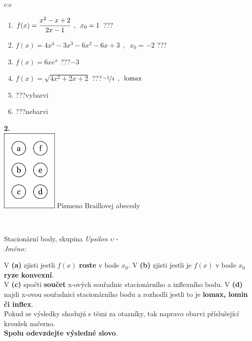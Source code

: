 \documentclass[10pt]{report}
\begin{document}
\begin{tabular}{c:c}
\begin{minipage}[c][104.5mm][t]{0.5\linewidth}
\begin{center}
\begin{minipage}{0.79\linewidth}
\begin{center}
\begin{varwidth}{\linewidth}
\begin{enumerate}
\item $f(x)=\cfrac{x^2-x+2}{2x-1}\enspace , \enspace x_0=1$\quad \dotfill\; ???\;\dotfill \quad {}
\item $f(x)=4x^4-3x^3-6x^2-6x+3\enspace , \enspace x_0=-2$\quad \dotfill\; ???\;\dotfill \quad {}
\item $f(x)=6xe^{x}$\quad \dotfill\; ???\;\dotfill \quad $-3$
\item $f(x)=\sqrt{4x^2+2x+2}$\quad \dotfill\; ???\;\dotfill \quad $\nicefrac{-1}{4}\enspace , \enspace\mathrm{lomax}$
\item \quad \dotfill\; ???\;\dotfill \quad vybarvi
\item \quad \dotfill\; ???\;\dotfill \quad nebarvi
\end{enumerate}
\end{varwidth}
\end{center}
\end{minipage}
\begin{minipage}{0.20\linewidth}
\begin{center}
{\Huge\bfseries 2.} \\[2mm]
\includegraphics[height=40mm]{../images/braille.png}
{\small Písmeno Braillovej abecedy}
\end{center}
\end{minipage}
\end{center}
\end{minipage}
\\ \hdashline
\begin{minipage}[c][104.5mm][t]{0.5\linewidth}
\begin{center}
\vspace{7mm}
{\huge Stacionární body, skupina \textit{Upsilon $\upsilon$} -}\\[5mm]
\textit{Jméno:}\phantom{xxxxxxxxxxxxxxxxxxxxxxxxxxxxxxxxxxxxxxxxxxxxxxxxxxxxxxxxxxxxxxxxx}\\[5mm]
\begin{minipage}{0.95\linewidth}
\begin{center}
{\small V \textbf{(a)} zjisti jestli $f(x)$ \textbf{roste} v bode $x_0$. V \textbf{(b)} zjisti jestli je $f(x)$ v bode $x_0$ \textbf{ryze konvexní}.\\V \textbf{(c)} spočti \textbf{součet} x-ových souřadnic stacionárního a inflexního bodu. V \textbf{(d)} najdi x-ovou souřadnici stacionárního bodu a rozhodli jestli to je \textbf{lomax, lomin či inflex}.\\Pokud se výsledky shodujú s těmi za otazníky, tak napravo obarvi příslušející kroužek načerno.\\\textbf{Spolu odevzdejte výsledné slovo}}.

\end{center}
\end{minipage}
\end{center}
\end{minipage}
\end{tabular}
\end{document}
